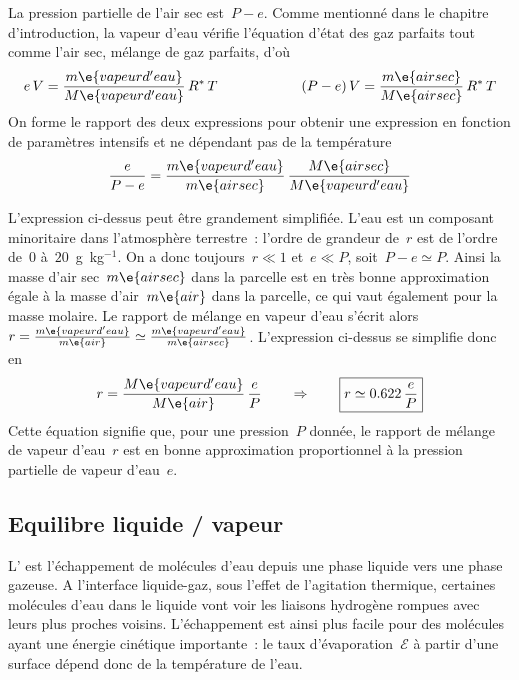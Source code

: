 \sk
La pression partielle de l'air sec est~$P - e$. Comme mentionné dans le chapitre d'introduction, la vapeur d'eau vérifie l'équation d'état des gaz parfaits tout comme l'air sec, mélange de gaz parfaits, d'où
\[  e \, V = \frac{m\e{vapeur d'eau}}{M\e{vapeur d'eau}} \, R^* \, T  \qquad \qquad \qquad (P-e) \, V = \frac{m\e{air sec}}{M\e{air sec}} \, R^* \, T  \]
On forme le rapport des deux expressions pour obtenir une expression en fonction de paramètres intensifs et ne dépendant pas de la température
\[ \frac{e}{P-e} = \frac{m\e{vapeur d'eau}}{m\e{air sec}} \, \frac{M\e{air sec}}{M\e{vapeur d'eau}} \]

\sk
L'expression ci-dessus peut être grandement simplifiée. L'eau est un composant minoritaire dans l'atmosphère terrestre~: l'ordre de grandeur de~$r$ est de l'ordre de~$0$ à~$20$~g~kg$^{-1}$. On a donc toujours~$r \ll 1$ et~$e \ll P$, soit~$P-e \simeq P$. Ainsi la masse d'air sec~$m\e{air sec}$ dans la parcelle est en très bonne approximation égale à la masse d'air~$m\e{air}$ dans la parcelle, ce qui vaut également pour la masse molaire. Le rapport de mélange en vapeur d'eau s'écrit alors~$r = \frac{m\e{vapeur d'eau}}{m\e{air}} \simeq \frac{m\e{vapeur d'eau}}{m\e{air sec}}$. L'expression ci-dessus se simplifie donc en
\[ r = \frac{M\e{vapeur d'eau}}{M\e{air}} \, \frac{e}{P} \qquad \Rightarrow \qquad \boxed{ r \simeq 0.622 \, \frac{e}{P} } \]
Cette équation signifie que, pour une pression~$P$ donnée, le rapport de mélange de vapeur d'eau~$r$ est en bonne approximation proportionnel à la pression partielle de vapeur d'eau~$e$.

\sk
\subsection{Equilibre liquide / vapeur}

\sk
L' est l'échappement de molécules d'eau depuis une phase liquide vers une phase gazeuse. A l'interface liquide-gaz, sous l'effet de l'agitation thermique, certaines molécules d'eau dans le liquide vont voir les liaisons hydrogène rompues avec leurs plus proches voisins. L'échappement est ainsi plus facile pour des molécules ayant une énergie cinétique importante~: le taux d'évaporation~$\mathcal{E}$ à partir d'une surface dépend donc de la température de l'eau. 

